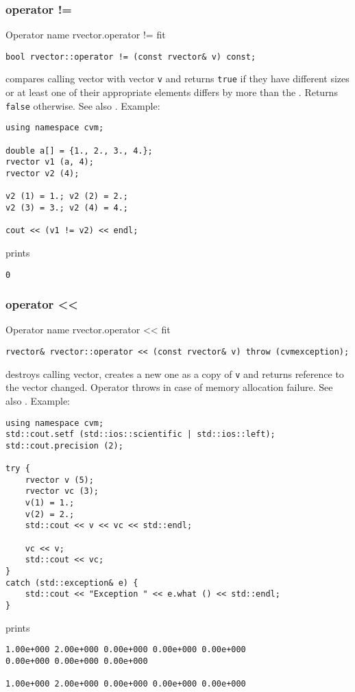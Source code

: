 \subsubsection{operator !=}
Operator%
\pdfdest name {rvector.operator !=} fit
\begin{verbatim}
bool rvector::operator != (const rvector& v) const;
\end{verbatim}
compares calling vector with vector \verb"v"
and returns \verb"true" if they have different sizes
or at least one of their appropriate elements
differs by more than the
.
Returns \verb"false" otherwise.
See also .
Example:
\begin{Verbatim}
using namespace cvm;

double a[] = {1., 2., 3., 4.};
rvector v1 (a, 4);
rvector v2 (4);

v2 (1) = 1.; v2 (2) = 2.;
v2 (3) = 3.; v2 (4) = 4.;

cout << (v1 != v2) << endl;
\end{Verbatim}
prints
\begin{Verbatim}
0
\end{Verbatim}
\newpage



\subsubsection{operator <{}<}
Operator%
\pdfdest name {rvector.operator <<} fit
\begin{verbatim}
rvector& rvector::operator << (const rvector& v) throw (cvmexception);
\end{verbatim}
destroys calling vector, creates a new one as a copy of \verb"v"
and returns  reference to the vector changed.
Operator throws  
in case of memory allocation failure.
See also .
Example:
\begin{Verbatim}
using namespace cvm;
std::cout.setf (std::ios::scientific | std::ios::left); 
std::cout.precision (2);

try {
    rvector v (5);
    rvector vc (3);
    v(1) = 1.;
    v(2) = 2.;
    std::cout << v << vc << std::endl;

    vc << v;
    std::cout << vc;
}
catch (std::exception& e) {
    std::cout << "Exception " << e.what () << std::endl;
}
\end{Verbatim}
prints
\begin{Verbatim}
1.00e+000 2.00e+000 0.00e+000 0.00e+000 0.00e+000
0.00e+000 0.00e+000 0.00e+000

1.00e+000 2.00e+000 0.00e+000 0.00e+000 0.00e+000
\end{Verbatim}
\newpage


